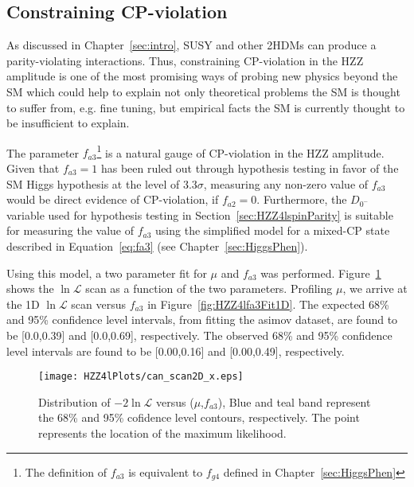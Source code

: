 \subsection{Constraining CP-violation}
\label{sec:HZZ4lcpViolation}

As discussed in Chapter~\ref{sec:intro}, SUSY and other 2HDMs
can produce a parity-violating interactions.
Thus, constraining CP-violation in the HZZ 
amplitude is one of the most promising ways of probing
new physics beyond the SM which could help to explain not only 
theoretical problems the SM is thought to suffer from, e.g. 
fine tuning, but empirical facts the SM is currently thought to
be insufficient to explain.  

The parameter $f_{a3}$\footnote{The definition of $f_{a3}$ is equivalent to $f_{g4}$ defined in Chapter~\ref{sec:HiggsPhen}}
is a natural gauge of CP-violation in the HZZ amplitude.  Given 
that $f_{a3}=1$
has been ruled out through hypothesis testing in favor of the
SM Higgs hypothesis at the level of $3.3\sigma$,  measuring any
non-zero value of $f_{a3}$ would be direct evidence of CP-violation,
if $f_{a2}=0$.  Furthermore, the 
$D_{0^-}$ variable used for hypothesis testing in 
Section~\ref{sec:HZZ4lspinParity} 
is suitable for measuring the value of $f_{a3}$ using the 
simplified model for a mixed-CP state described in 
Equation~\ref{eq:fa3} (see Chapter~\ref{sec:HiggsPhen}).

Using this model, a two parameter fit for $\mu$ and $f_{a3}$ was 
performed.  
Figure~\ref{fig:HZZ4lfa3Fit2D} shows the $\ln\mathscr{L}$ scan as a 
function of the two parameters.  
Profiling $\mu$, we 
arrive at the 1D $\ln\mathscr{L}$ scan versus $f_{a3}$ in 
Figure~\ref{fig:HZZ4lfa3Fit1D}.  The expected 68\% and 95\% confidence level 
intervals, from fitting the asimov dataset, are found to be 
[0.0,0.39] and [0.0,0.69], respectively. 
The observed  68\% and 95\% confidence level
intervals are found to be [0.00,0.16] and [0.00,0.49], 
respectively. 

\begin{figure}
\begin{center}
\texttt{[image: HZZ4lPlots/can\_scan2D\_x.eps]}
\caption{Distribution of $-2\ln\mathscr{L}$ versus ($\mu$,$f_{a3}$),
Blue and teal band represent the 68\% and 95\% cofidence level
contours, respectively.  The point represents the location of the
maximum likelihood.}
\label{fig:HZZ4lfa3Fit2D}
\end{center}
\end{figure}

